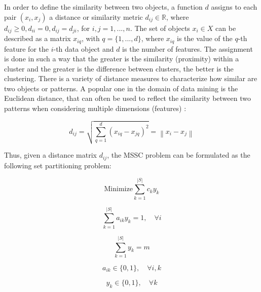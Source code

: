 In order to define the similarity between two objects, a function $d$ assigns to each pair $(x_i, x_j)$ a distance or similarity metric $d_{ij} \in \mathbb{R}$, where $d_{ij} \geq 0, d_{ii} = 0, d_{ij} = d_{ji}$, for $i, j = 1, ... ,n$. The set of objects $x_i \in X$ can be described as a matrix $x_{iq}$, with $q = \{1,...,d\}$, where $x_{iq}$ is the value of the $q$-th feature for the $i$-th data object and $d$ is the number of features. The assignment is done in such a way that the greater is the similarity (proximity) within a cluster and the greater is the difference between clusters, the better is the clustering. There is a variety of distance measures to characterize how similar are two objects or patterns. A popular one in the domain of data mining is the Euclidean distance, that can often be used to reflect the similarity between two patterns when considering multiple dimensions (features) \cite{Jain1999}:

\begin{equation}
d_{ij} = \sqrt{\sum_{q=1}^{d}(x_{iq} - x_{jq})^2} = \left \| x_i - x_j \right \|
\end{equation}

Thus, given a distance matrix $d_{ij}$, the MSSC problem can be formulated as the following set partitioning problem:

\begin{equation} \label{eq:of}
\textrm{Minimize} \sum_{k=1}^{\left | S \right |}c_ky_k
\end{equation}


\begin{equation}
\sum_{k=1}^{\left | S \right |}a_{ik}y_k = 1, \quad \forall i
\end{equation}

\begin{equation}
\sum_{k=1}^{\left | S \right |}y_k = m
\end{equation}

\begin{equation}
a_{ik} \in \{0,1\}, \quad \forall i,k
\end{equation}

\begin{equation}
y_k \in \{0,1\}, \quad \forall k
\end{equation}

